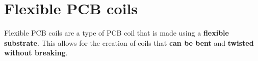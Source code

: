 \section{Flexible PCB coils}
Flexible PCB coils are a type of PCB coil that is made using a \textbf{flexible substrate}. This allows for the creation of coils that \textbf{can be bent} and \textbf{twisted without breaking}.





